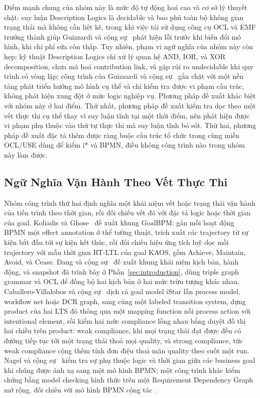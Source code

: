Điểm mạnh chung của nhóm này là mức độ tự động hoá cao và cơ sở lý thuyết chặt: suy luận Description
Logics là decidable và bao phủ toàn bộ không gian trạng thái mà không cần liệt kê, trong khi việc
tái sử dụng công cụ OCL và EMF trưởng thành giúp Guizzardi và cộng sự~\cite{guizzardi2014vemi} phát
hiện lỗi trước khi biến đổi mô hình, khi chi phí sửa còn thấp. Tuy nhiên, phạm vi ngữ nghĩa của nhóm
này còn hẹp: kỹ thuật Description Logics chỉ xử lý quan hệ AND, IOR, và XOR decomposition, chưa mã
hoá contribution link, và gặp rủi ro undecidable khi quy trình có vòng lặp; công trình của Guizzardi
và cộng sự~\cite{guizzardi2014vemi} gắn chặt với một nền tảng phát triển hướng mô hình cụ thể và chỉ
kiểm tra được vi phạm cấu trúc, không phát hiện xung đột ở mức logic nghiệp vụ. Phương pháp đề xuất
khác biệt với nhóm này ở hai điểm. Thứ nhất, phương pháp đề xuất kiểm tra dọc theo một vết thực thi
cụ thể thay vì suy luận tĩnh tại một thời điểm, nên phát hiện được vi phạm phụ thuộc vào thứ tự thực
thi mà suy luận tĩnh bỏ sót. Thứ hai, phương pháp đề xuất đặc tả thêm được ràng buộc cấu trúc tổ
chức trong cùng miền OCL/USE dùng để kiểm i* và BPMN, điều không công trình nào trong nhóm này làm
được.

\subsection{Ngữ Nghĩa Vận Hành Theo Vết Thực Thi}\label{sec:rw-operational}

Nhóm công trình thứ hai định nghĩa một khái niệm vết hoặc trạng thái vận hành của tiến trình theo
thời gian, rồi đối chiếu vết đó với đặc tả logic hoặc thời gian của goal. Koliadis và
Ghose~\cite{koliadis2006goalbpm} đề xuất khung GoalBPM: gán mỗi hoạt động BPMN một effect annotation
ở thể tường thuật, trích xuất các trajectory từ sự kiện bắt đầu tới sự kiện kết thúc, rồi đối chiếu
hiệu ứng tích luỹ dọc mỗi trajectory với mẫu thời gian RT-LTL của goal KAOS, gồm Achieve, Maintain,
Avoid, và Cease. Dang và cộng sự~\cite{dang2010jucs} đề xuất khung khái niệm kịch bản, hành động, và
snapshot đã trình bày ở Phần~\ref{sec:introduction}, dùng triple graph grammar và OCL để đồng bộ hai
kịch bản ở hai mức trừu tượng khác nhau. Caballero-Villalobos và cộng
sự~\cite{caballero2026alig} dịch cả goal model iStar lẫn process model, workflow net hoặc DCR graph,
sang cùng một labeled transition system, dựng product của hai LTS đó thông qua một mapping function
nối process action với intentional element, rồi kiểm hai mức compliance lồng nhau bằng duyệt đồ thị
hai chiều trên product: weak compliance, khi mọi trạng thái đạt được đều có đường tiếp tục tới một
trạng thái thoả mọi quality, và strong compliance, tức weak compliance cộng thêm tính đơn điệu thoả
mãn quality theo suốt một run. Nagel và cộng sự~\cite{nagel2013consistency} kiểm tra sự phụ thuộc
logic và thời gian giữa các business goal khi chúng được ánh xạ sang một mô hình BPMN; một công trình
khác kiểm chứng bằng model checking hình thức trên một Requirement Dependency Graph mở rộng, đối
chiếu với mô hình BPMN cộng tác~\cite{n3_2019_reqdepgraph}.

